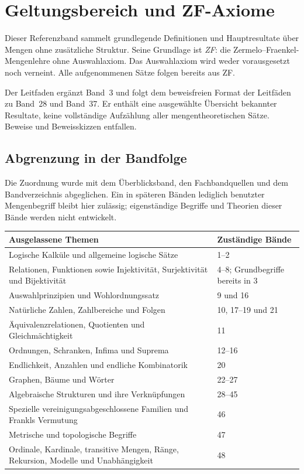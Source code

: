 \chapter{Geltungsbereich und ZF-Axiome}

Dieser Referenzband sammelt grundlegende Definitionen und Hauptresultate
über Mengen ohne zusätzliche Struktur. Seine Grundlage ist
\emph{ZF}: die Zermelo--Fraenkel-Mengenlehre ohne Auswahlaxiom.
Das Auswahlaxiom wird weder vorausgesetzt noch verneint.
Alle aufgenommenen Sätze folgen bereits aus ZF.

Der Leitfaden ergänzt Band~3 und folgt dem beweisfreien Format der
Leitfäden zu Band~28 und Band~37. Er enthält eine ausgewählte Übersicht
bekannter Resultate, keine vollständige Aufzählung aller
mengentheoretischen Sätze. Beweise und Beweisskizzen entfallen.

\section{Abgrenzung in der Bandfolge}

Die Zuordnung wurde mit dem Überblicksband, den Fachbandquellen und
dem Bandverzeichnis abgeglichen. Ein in späteren Bänden lediglich
benutzter Mengenbegriff bleibt hier zulässig; eigenständige Begriffe
und Theorien dieser Bände werden nicht entwickelt.

\begin{center}
\small
\begin{tabularx}{\linewidth}{@{}p{.59\linewidth}X@{}}
\toprule
Ausgelassene Themen & Zuständige Bände\\
\midrule
Logische Kalküle und allgemeine logische Sätze & 1--2\\
Relationen, Funktionen sowie Injektivität, Surjektivität und Bijektivität
  & 4--8; Grundbegriffe bereits in 3\\
Auswahlprinzipien und Wohlordnungssatz & 9 und 16\\
Natürliche Zahlen, Zahlbereiche und Folgen & 10, 17--19 und 21\\
Äquivalenzrelationen, Quotienten und Gleichmächtigkeit & 11\\
Ordnungen, Schranken, Infima und Suprema & 12--16\\
Endlichkeit, Anzahlen und endliche Kombinatorik & 20\\
Graphen, Bäume und Wörter & 22--27\\
Algebraische Strukturen und ihre Verknüpfungen & 28--45\\
Spezielle vereinigungsabgeschlossene Familien und Frankls Vermutung & 46\\
Metrische und topologische Begriffe & 47\\
Ordinale, Kardinale, transitive Mengen, Ränge, Rekursion,
Modelle und Unabhängigkeit & 48\\
\bottomrule
\end{tabularx}
\end{center}

